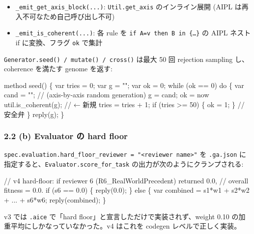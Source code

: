 \documentclass[
]{ltjsarticle}
\newenvironment{Shaded}{}{}
\newcommand{\NormalTok}[1]{#1}
\providecommand{\tightlist}{%
  \setlength{\itemsep}{0pt}\setlength{\parskip}{0pt}}
\begin{document}
\begin{itemize}
\tightlist
\item
  \texttt{\_emit\_get\_axis\_block(...)}: \texttt{Util.get\_axis}
  のインライン展開 (AIPL は再入不可なため自己呼び出し不可)
\item
  \texttt{\_emit\_is\_coherent(...)}: 各 rule を
  \texttt{if\ A=v\ then\ B\ in\ \{…\}} の AIPL ネスト if に変換、フラグ
  \texttt{ok} で集計
\end{itemize}

\texttt{Generator.seed()\ /\ mutate()\ /\ cross()} は最大 50 回
rejection sampling し、coherence を満たす genome を返す:

\begin{Shaded}
\begin{Highlighting}[]
\NormalTok{method seed() \{}
\NormalTok{  var tries = 0; var g = ""; var ok = 0;}
\NormalTok{  while (ok == 0) do \{}
\NormalTok{    var cand = "";}
\NormalTok{    // (axis{-}by{-}axis random generation)}
\NormalTok{    g = cand;}
\NormalTok{    ok = now util.is\_coherent(g);     // ← 新規}
\NormalTok{    tries = tries + 1;}
\NormalTok{    if (tries \textgreater{}= 50) \{ ok = 1; \}      // 安全弁}
\NormalTok{  \}}
\NormalTok{  reply(g);}
\NormalTok{\}}
\end{Highlighting}
\end{Shaded}

\subsubsection{2.2 (b) Evaluator の hard
floor}\label{b-evaluator-ux306e-hard-floor}

\texttt{spec.evaluation.hard\_floor\_reviewer\ =\ "\textless{}reviewer\ name\textgreater{}"}
を \texttt{.ga.json} に指定すると、\texttt{Evaluator.score\_for\_task}
の出力が次のようにクランプされる:

\begin{Shaded}
\begin{Highlighting}[]
\NormalTok{// v4 hard{-}floor: if reviewer 6 (\textquotesingle{}R6\_RealWorldPrecedent\textquotesingle{}) returned 0.0,}
\NormalTok{//                overall fitness = 0.0.}
\NormalTok{if (s6 == 0.0) \{ reply(0.0); \}}
\NormalTok{else \{}
\NormalTok{  var combined = s1*w1 + s2*w2 + ... + s6*w6;}
\NormalTok{  reply(combined);}
\NormalTok{\}}
\end{Highlighting}
\end{Shaded}

v3 では \texttt{.aice} で「hard
floor」と宣言しただけで実装されず、weight 0.10
の加重平均にしかなっていなかった。v4 はこれを codegen
レベルで正しく実装。
\end{document}
